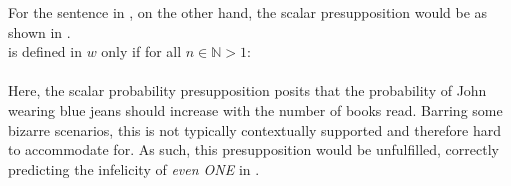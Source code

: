 For the sentence in , on the other hand, the scalar presupposition would be as shown in .
\ex{}
{}\\ is defined in $w$ only if for all $n\in\mathbb{N}>1$:\\
\\
\resizebox{395pt}{!}{$\forall v:v\in f_\leqslant([\lambda w'_s.\exists_n{x}[\predicate{read}(j,x,w')\land\predicate{book}(x,w')]],w)[\exists{y}[\predicate{wear}(j,y,v)\land\predicate{jeans}(y,v)]$}
\xe
Here, the scalar probability presupposition posits that the probability of John wearing blue jeans should increase with the number of books read. Barring some bizarre scenarios, this is not typically contextually supported and therefore hard to accommodate for. As such, this presupposition would be unfulfilled, correctly predicting the infelicity of \textit{even \MakeUppercase{one}} in .

